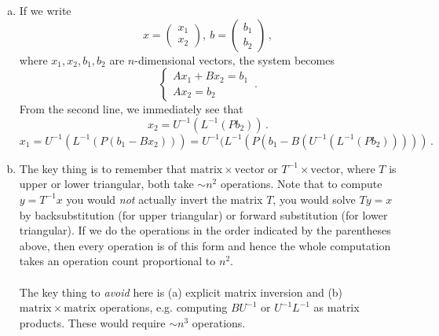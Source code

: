 \documentclass{article}
\begin{document}
\begin{enumerate}[(a)]
    \item If we write
    \[x=\begin{pmatrix}x_1\\x_2\end{pmatrix},\ b=\begin{pmatrix}b_1\\b_2\end{pmatrix}\,,\]
    where $x_1, x_2, b_1, b_2$ are $n$-dimensional vectors, the system becomes
    \[\begin{cases} Ax_1 + Bx_2 = b_1\\ Ax_2=b_2\end{cases}\,.\]
    From the second line, we immediately see that
    \[x_2 = U^{-1}(L^{-1}(Pb_2))\,.\]
    \[x_1 = U^{-1}(L^{-1}(P(b_1-Bx_2))) = U^{-1}(L^{-1}(P(b_1-B(U^{-1}(L^{-1}(Pb_2)))))\,.\]
  \item The key thing is to remember that $\mathrm{matrix} \times \mathrm{vector}$ or $T^{-1} \times \mathrm{vector}$, where $T$ is upper or lower triangular, both take $\sim n^2$ operations.  Note that to compute $y=T^{-1}x$ you would \emph{not} actually invert the matrix $T$, you would solve $Ty=x$ by backsubstitution (for upper triangular) or forward substitution (for lower triangular).   If we do the operations in the order indicated by the parentheses above, then every operation is of this form and hence the whole computation takes an operation count proportional to $n^2$.
    \\
    \\
    The key thing to \emph{avoid} here is (a) explicit matrix inversion and (b) $\mathrm{matrix} \times \mathrm{matrix}$ operations, e.g. computing $BU^{-1}$ or $U^{-1}L^{-1}$ as matrix products.  These would require $\sim n^3$ operations.
\end{enumerate}
\end{document}
